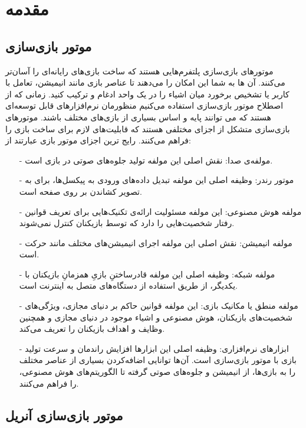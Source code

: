 \chapter{مقدمه}

\section{موتور بازی‌سازی}
موتور‌های بازی‌سازی پلتفرم‌هایی هستند که ساخت بازی‌های رایانه‌ای را آسان‌تر می‌کنند.
آن ها به شما این امکان را می‌دهند تا عناصر بازی مانند انیمیشن، تعامل با کاربر یا تشخیص برخورد میان اشیاء را در یک واحد ادغام و ترکیب کنید.
\cite{barczak2019comparative}
زمانی که از اصطلاح موتور بازی‌سازی استفاده می‌کنیم منظورمان نرم‌افزارهای قابل توسعه‌ای هستند که می توانند پایه و اساس بسیاری از بازی‌های مختلف باشند.
\cite{GameEngineArchitecture}
موتورهای بازی‌سازی متشکل از اجزای مختلفی هستند که قابلیت‌های لازم برای ساخت بازی را فراهم می‌کنند.
رایج ترین اجزای موتور بازی عبارتند از:
\cite{barczak2019comparative}
\begin{itemize}
    \item[-] مولفه‌ی صدا: نقش اصلی این مولفه تولید جلوه‌های صوتی در بازی است.
    \item[-] موتور رندر: وظیفه اصلی این مولفه تبدیل داده‌های ورودی به پیکسل‌ها، برای به تصویر کشاندن بر روی صفحه است.
    \item[-] مولفه هوش مصنوعی: این مولفه مسئولیت ارائه‌ی تکنیک‌هایی برای تعریف قوانین رفتار شخصیت‌هایی را دارد که توسط بازیکنان کنترل نمی‌شوند.
    \item[-] مولفه انیمیشن: نقش اصلی این مولفه اجرای انیمیشن‌های مختلف مانند حرکت است.
    \item[-] مولفه شبکه: وظیفه اصلی این مولفه قادرساختنِ بازیِ همزمانِ بازیکنان با یکدیگر، از طریق استفاده از دستگاه‌های متصل به اینترنت است.
    \item[-] مولفه منطق یا مکانیک بازی: این مولفه قوانین حاکم بر دنیای مجازی، ویژگی‌های شخصیت‌های بازیکنان، هوش مصنوعی و اشیاء موجود در دنیای مجازی و همچنین وظایف و اهداف بازیکنان را تعریف می‌کند.
    \item[-] ابزارهای نرم‌افزاری: وظیفه اصلی این ابزارها افزایش راندمان و سرعت تولید بازی با موتور بازی‌سازی است. آن‌ها توانایی اضافه‌کردن بسیاری از عناصر مختلف را به بازی‌ها، از انیمیشن و جلوه‌های صوتی گرفته تا الگوریتم‌های هوش مصنوعی، را فراهم می‌کنند.   
\end{itemize}

\section {موتور بازی‌سازی آنریل}

